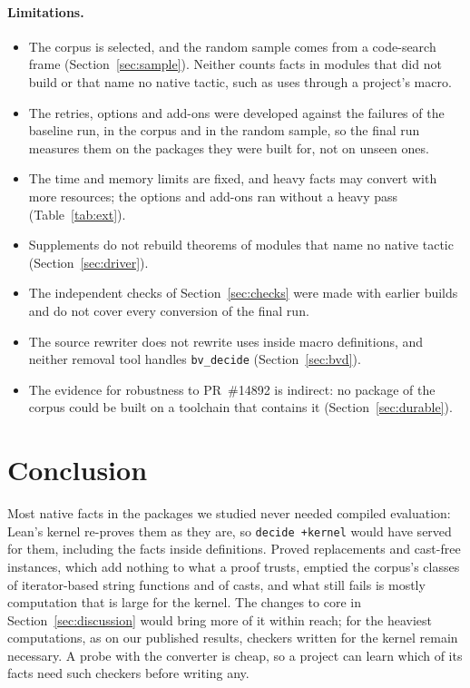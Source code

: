 \documentclass[11pt]{article}
\begin{document}
\paragraph{Limitations.}
\begin{itemize}
\item The corpus is selected, and the random sample comes from a code-search frame
  (Section~\ref{sec:sample}). Neither counts facts in modules that did not build or that name no native
  tactic, such as uses through a project's macro.
\item The retries, options and add-ons were developed against the failures of the baseline run, in the corpus
  and in the random sample, so the final run measures them on the packages they were built for, not on unseen
  ones.
\item The time and memory limits are fixed, and heavy facts may convert with more resources; the options and
  add-ons ran without a heavy pass (Table~\ref{tab:ext}).
\item Supplements do not rebuild theorems of modules that name no native tactic (Section~\ref{sec:driver}).
\item The independent checks of Section~\ref{sec:checks} were made with earlier builds and do not cover
  every conversion of the final run.
\item The source rewriter does not rewrite uses inside macro definitions, and neither removal tool handles
  \texttt{bv\_decide} (Section~\ref{sec:bvd}).
\item The evidence for robustness to PR~\#14892 is indirect: no package of the corpus could be built on a
  toolchain that contains it (Section~\ref{sec:durable}).
\end{itemize}

\section{Conclusion}\label{sec:conclusion}
Most native facts in the packages we studied never needed compiled evaluation: Lean's kernel re-proves them
as they are, so \texttt{decide +kernel} would have served for them, including the facts inside definitions. Proved replacements and cast-free instances, which add nothing to what a proof trusts, emptied the
corpus's classes of iterator-based string functions and of casts, and what still fails is mostly computation
that is large for the kernel. The changes to core in Section~\ref{sec:discussion} would bring more of it within
reach; for the heaviest computations, as on our published results, checkers written for the kernel remain
necessary. A probe with the converter is cheap, so a project can learn which of its facts need such checkers
before writing any.
\end{document}
